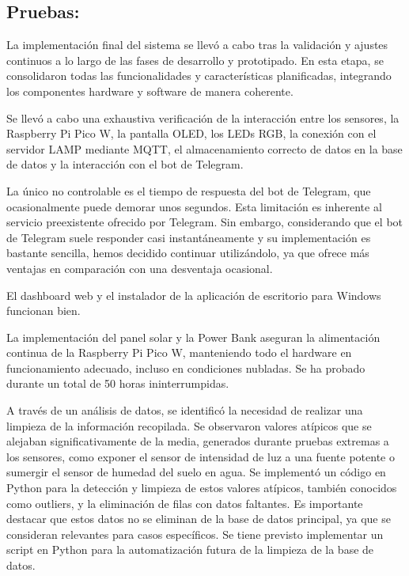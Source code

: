 \subsection{Pruebas:}

La implementación final del sistema se llevó a cabo tras la validación y ajustes continuos a lo largo de las fases de desarrollo y prototipado. En esta etapa, se consolidaron todas las funcionalidades y características planificadas, integrando los componentes hardware y software de manera coherente.

Se llevó a cabo una exhaustiva verificación de la interacción entre los sensores, la Raspberry Pi Pico W, la pantalla OLED, los LEDs RGB, la conexión con el servidor LAMP mediante MQTT, el almacenamiento correcto de datos en la base de datos y la interacción con el bot de Telegram.

La único no controlable es el tiempo de respuesta del bot de Telegram, que ocasionalmente puede demorar unos segundos. Esta limitación es inherente al servicio preexistente ofrecido por Telegram. Sin embargo, considerando que el bot de Telegram suele responder casi instantáneamente y su implementación es bastante sencilla, hemos decidido continuar utilizándolo, ya que ofrece más ventajas en comparación con una desventaja ocasional.

El dashboard web y el instalador de la aplicación de escritorio para Windows funcionan bien.

La implementación del panel solar y la Power Bank aseguran la alimentación continua de la Raspberry Pi Pico W, manteniendo todo el hardware en funcionamiento adecuado, incluso en condiciones nubladas. Se ha probado durante un total de 50 horas ininterrumpidas.

A través de un análisis de datos, se identificó la necesidad de realizar una limpieza de la información recopilada. Se observaron valores atípicos que se alejaban significativamente de la media, generados durante pruebas extremas a los sensores, como exponer el sensor de intensidad de luz a una fuente potente o sumergir el sensor de humedad del suelo en agua. Se implementó un código en Python para la detección y limpieza de estos valores atípicos, también conocidos como outliers, y la eliminación de filas con datos faltantes. Es importante destacar que estos datos no se eliminan de la base de datos principal, ya que se consideran relevantes para casos específicos. Se tiene previsto implementar un script en Python para la automatización futura de la limpieza de la base de datos.

